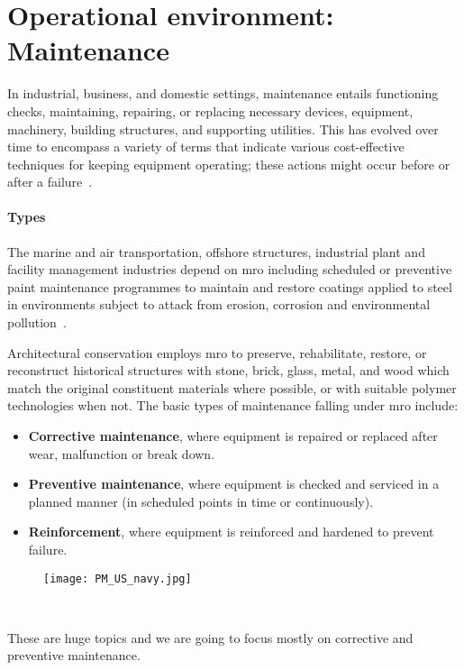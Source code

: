 \section{Operational environment: Maintenance}\label{section:maintenance}
In industrial, business, and domestic settings, maintenance entails functioning checks, maintaining, repairing,
or replacing necessary devices, equipment,  machinery, building structures, and supporting utilities.
This has evolved over time to encompass a variety of terms that indicate various cost-effective techniques for keeping equipment operating;
these actions might occur before or after a failure~\cite{Misc:maintenance_2016_efnms}. %

\paragraph{Types}
The marine and air transportation, offshore structures, industrial plant and facility management industries depend on \ac{mro} including scheduled or preventive paint maintenance programmes to maintain and restore coatings applied
to steel in environments subject to attack from erosion, corrosion and environmental pollution~\cite{Report:iso_2018_paints}.

Architectural conservation employs \ac{mro} to preserve, rehabilitate, restore, or reconstruct historical structures with stone,
brick, glass, metal, and wood which match the original constituent materials where possible, or with suitable polymer technologies when not.
The basic types of maintenance falling under \acs{mro} include:
\begin{itemize}
    \item \textbf{Corrective maintenance}, where equipment is repaired or replaced after wear, malfunction or break down.
    \item \textbf{Preventive maintenance}, where equipment is checked and serviced in a planned manner (in scheduled points in time or continuously).
    \item \textbf{Reinforcement}, where equipment is reinforced and hardened to prevent failure.
\end{itemize}
\begin{figure}[t]
    \centering
    \texttt{[image: PM\_US\_navy.jpg]}
    \caption{~\cite{file:boat_2016_uss}}
    \label{fig:boat_us_navy}
\end{figure}
These are huge topics and we are going to focus mostly on corrective and preventive maintenance.

